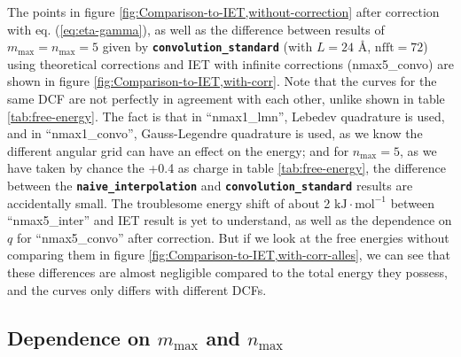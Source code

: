 The points in figure \ref{fig:Comparison-to-IET,without-correction}
after correction with eq. (\ref{eq:eta-gamma}), as well as the difference
between results of $m_{\max}=n_{\max}=5$ given by \texttt{\textbf{convolution\_standard}}
(with $L=24$ $\textrm{Å}$, $\mathrm{nfft}=72$) using theoretical
corrections and \acs{IET} with infinite corrections (nmax5\_convo)
are shown in figure \ref{fig:Comparison-to-IET,with-corr}. Note that
the curves for the same \acs{DCF} are not perfectly in agreement
with each other, unlike shown in table \ref{tab:free-energy}. The
fact is that in ``nmax1\_lmn'', Lebedev quadrature is used, and
in ``nmax1\_convo'', Gauss-Legendre quadrature is used, as we know
the different angular grid can have an effect on the energy; and for
$n_{\max}=5$, as we have taken by chance the +0.4 as charge in table
\ref{tab:free-energy}, the difference between the \texttt{\textbf{naive\_interpolation}}
and \texttt{\textbf{convolution\_standard}} results are accidentally
small. The troublesome energy shift of about 2 $\mathrm{kJ}\cdot\mathrm{mol^{-1}}$
between ``nmax5\_inter'' and \acs{IET} result is yet to understand,
as well as the dependence on $q$ for ``nmax5\_convo'' after correction.
But if we look at the free energies without comparing them in figure
\ref{fig:Comparison-to-IET,with-corr-alles}, we can see that these
differences are almost negligible compared to the total energy they
possess, and the curves only differs with different \acs{DCF}s.

\subsection{Dependence on $m_{\max}$ and $n_{\max}$}

